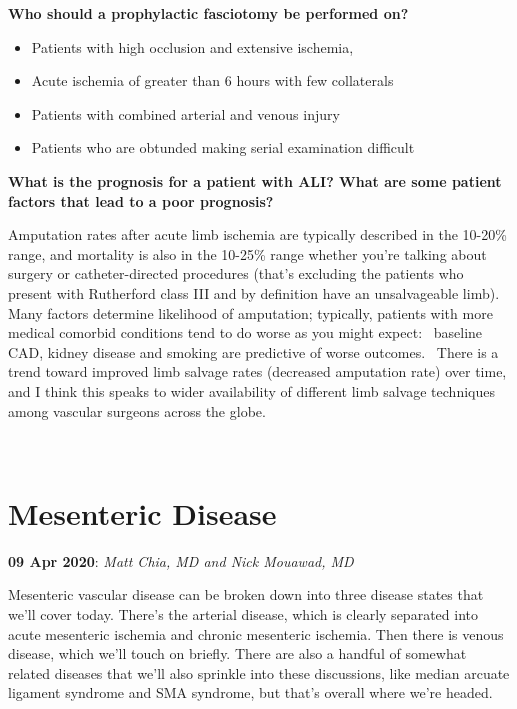 \documentclass[
]{book}
\begin{document}
\textbf{Who should a prophylactic fasciotomy be performed on?}

\begin{itemize}
\item
  Patients with high occlusion and extensive ischemia,~
\item
  Acute ischemia of greater than 6 hours with few collaterals
\item
  Patients with combined arterial and venous injury
\item
  Patients who are obtunded making serial examination difficult
\end{itemize}

\textbf{What is the prognosis for a patient with ALI? What are some patient
factors that lead to a poor prognosis?}

Amputation rates after acute limb ischemia are typically described in
the 10-20\% range, and mortality is also in the 10-25\% range whether
you're talking about surgery or catheter-directed procedures (that's
excluding the patients who present with Rutherford class III and by
definition have an unsalvageable limb).~ Many factors determine
likelihood of amputation; typically, patients with more medical comorbid
conditions tend to do worse as you might expect:~ baseline CAD, kidney
disease and smoking are predictive of worse outcomes.~ There is a trend
toward improved limb salvage rates (decreased amputation rate) over
time, and I think this speaks to wider availability of different limb
salvage techniques among vascular surgeons across the globe.\\
\strut \\

\hypertarget{mesenteric-disease}{%
\chapter{Mesenteric Disease}\label{mesenteric-disease}}

\textbf{09 Apr 2020}: \emph{Matt Chia, MD and Nick Mouawad, MD}

Mesenteric vascular disease can be broken down into three disease states
that we'll cover today. There's the arterial disease, which is clearly
separated into acute mesenteric ischemia and chronic mesenteric
ischemia. Then there is venous disease, which we'll touch on briefly.
There are also a handful of somewhat related diseases that we'll also
sprinkle into these discussions, like median arcuate ligament syndrome
and SMA syndrome, but that's overall where we're headed.
\end{document}
